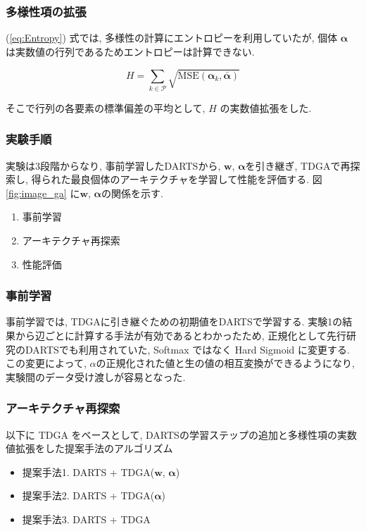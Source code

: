\subsubsection{多様性項の拡張}
(\ref{eq:Entropy}) 式では, 多様性の計算にエントロピーを利用していたが,
個体 $\bm{\alpha}$ は実数値の行列であるためエントロピーは計算できない.

\begin{equation}
H = \sum_{k \in \mathcal{P}} \sqrt{\mathrm{MSE}(\bm{\alpha}_k, \bar{\bm{\alpha}})} \label{eq:Entropy-new}
\end{equation}

そこで行列の各要素の標準偏差の平均として, $H$ の実数値拡張をした.


\subsubsection{実験手順}
実験は3段階からなり, 事前学習したDARTSから, $\bm{w}$, $\bm{\alpha}$を引き継ぎ,
TDGAで再探索し, 得られた最良個体のアーキテクチャを学習して性能を評価する.
図 \ref{fig:image_ga} に$\bm{w}$, $\bm{\alpha}$の関係を示す.

\begin{enumerate}
  \item 事前学習
  \item アーキテクチャ再探索
  \item 性能評価
\end{enumerate}

\subsubsection{事前学習}

事前学習では, TDGAに引き継ぐための初期値をDARTSで学習する.
実験1の結果から辺ごとに計算する手法が有効であるとわかったため,
正規化として先行研究のDARTSでも利用されていた,
Softmax ではなく Hard Sigmoid に変更する.
この変更によって, $\alpha$の正規化された値と生の値の相互変換ができるようになり,
実験間のデータ受け渡しが容易となった.


\subsubsection{アーキテクチャ再探索}

以下に TDGA をベースとして, DARTSの学習ステップの追加と多様性項の実数値拡張をした提案手法のアルゴリズム

\begin{itemize}
  \item 提案手法1. DARTS + TDGA($\bm{w}$, $\bm{\alpha}$)
  \item 提案手法2. DARTS + TDGA($\bm{\alpha}$)
  \item 提案手法3. DARTS + TDGA
\end{itemize}

